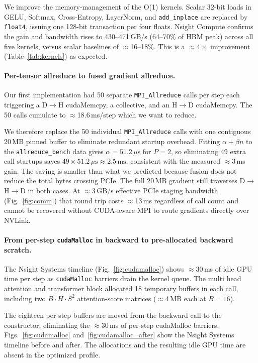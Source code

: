 \documentclass[11pt,letterpaper]{article}
\begin{document}
We improve the memory-management of the O(1) kernels. Scalar 32-bit loads in GELU, Softmax, Cross-Entropy, LayerNorm, and
\texttt{add\_inplace} are replaced by \texttt{float4}, issuing one
128-bit transaction per four floats. Nsight Compute confirms the gain and
bandwidth rises to 430--471\,GB/s (64--70\% of HBM peak) across all five
kernels, versus scalar baselines of $\approx$16--18\%.
This is a $\approx4\times$ improvement (Table~\ref{tab:kernels}) as expected.

\paragraph{Per-tensor allreduce to fused gradient allreduce.} Our first implementation had 50 separate \texttt{MPI\_Allreduce}
calls per step each triggering a D$\to$H cudaMemcpy, a collective, and an
H$\to$D cudaMemcpy. The 50 calls cumulate to $\approx$18.6\,ms/step which we want to reduce.



We therefore replace the 50 individual \texttt{MPI\_Allreduce} calls with one contiguous 20\,MB pinned buffer to eliminate redundant startup overhead.
Fitting $\alpha{+}\beta n$ to the \texttt{allreduce\_bench} data gives
$\alpha{=}51.2\,\mu$s for $P{=}2$, so eliminating 49 extra call startups
saves $49{\times}51.2\,\mu\text{s}\approx2.5\,\text{ms}$, consistent
with the measured $\approx$3\,ms gain. The saving is smaller than
what we predicted because fusion does not reduce the total bytes crossing PCIe.
The full 20\,MB gradient still traverses D$\to$H$\to$D in both cases.
At $\approx$3\,GB/s effective PCIe staging bandwidth (Fig.~\ref{fig:comm}) that round trip costs $\approx$13\,ms regardless of call
count and cannot be recovered without CUDA-aware MPI to route gradients directly
over NVLink.

\paragraph{From per-step \texttt{cudaMalloc} in backward to pre-allocated backward scratch.}
 The Nsight
Systems timeline (Fig.~\ref{fig:cudamalloc}) shows $\approx$30\,ms of idle GPU
time per step as \texttt{cudaMalloc} barriers drain the kernel queue. The multi head attention and transformer block allocated 18 temporary buffers in each
call, including two $B{\cdot}H{\cdot}S^2$ attention-score matrices
($\approx$4\,MB each at $B{=}16$).

The eighteen per-step buffers are moved from the backward call to the
constructor, eliminating the $\approx$30\,ms of per-step cudaMalloc barriers. Figs.~\ref{fig:cudamalloc}
and~\ref{fig:cudamalloc_after} show the Nsight Systems timeline before and after.
The allocations and the resulting idle GPU time are absent in the optimized
profile.
\end{document}
